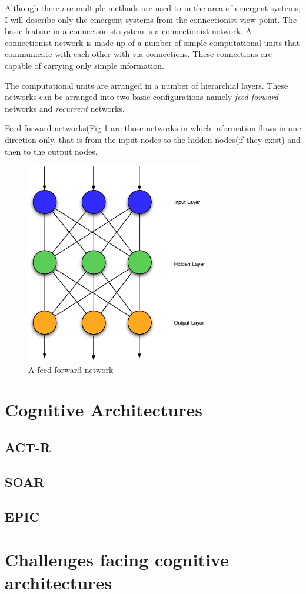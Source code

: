      Although there are multiple methods are used to in the area of
     emergent systems, I will describe only the emergent systems from
     the connectionist view point. The basic feature in a
     connectionist system is a connectionist network. A connectionist
     network is made up of a number of simple computational units that
     communicate with each other with via connections. These
     connections are capable of carrying only simple
     information.

     
     The computational units are arranged in a number of hierarchial
     layers. These networks can be arranged into two basic configurations
     namely \emph{feed forward} networks and \emph{recurrent}
     networks. 

     Feed forward networks(Fig \ref{ASCA_AFFN} are those networks in
     which information flows in one direction only, that is from the
     input nodes to the hidden nodes(if they exist) and then to the output nodes. 

     \begin{figure}[htp]
     \centering
     \includegraphics[width=80mm]{FeedForwardNetwork.eps}
     \caption{A feed forward network}
     \label{ASCA_AFFN}
     \end{figure}
     



     
     
\section{Cognitive Architectures}
\subsection{ACT-R}
\subsection{SOAR}
\subsection{EPIC}
\section{Challenges facing cognitive architectures}
